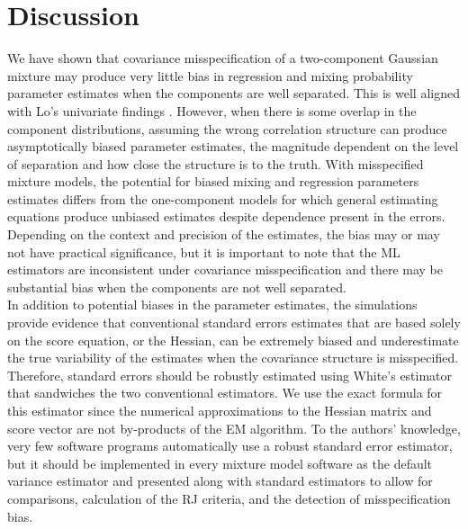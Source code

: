 \section{Discussion}
We have shown that covariance misspecification of a two-component Gaussian mixture may produce very little bias in regression and mixing probability parameter estimates when the components are well separated. This is well aligned with Lo's univariate findings \cite{lo2011}. However, when there is some overlap in the component distributions, assuming the wrong correlation structure can produce asymptotically biased parameter estimates, the magnitude dependent on the level of separation and how close the structure is to the truth. With misspecified mixture models, the potential for biased mixing and regression parameters estimates differs from the one-component models for which general estimating equations \cite{liang1986} produce unbiased estimates despite dependence present in the errors. Depending on the context and precision of the estimates, the bias may or may not have practical significance, but it is important to note that the ML estimators are inconsistent under covariance misspecification and there may be substantial bias when the components are not well separated.\\

In addition to potential biases in the parameter estimates, the simulations provide evidence that conventional standard errors estimates that are based solely on the score equation, or the Hessian, can be extremely biased and underestimate the true variability of the estimates when the covariance structure is misspecified. Therefore, standard errors should be robustly estimated using White's estimator that sandwiches the two conventional estimators. We use the exact formula for this estimator since the numerical approximations to the Hessian matrix and score vector are not by-products of the EM algorithm. To the authors' knowledge, very few software programs automatically use a robust standard error estimator, but it should be implemented in every mixture model software as the default variance estimator and presented along with standard estimators to allow for comparisons, calculation of the RJ criteria, and the detection of misspecification bias. \\

